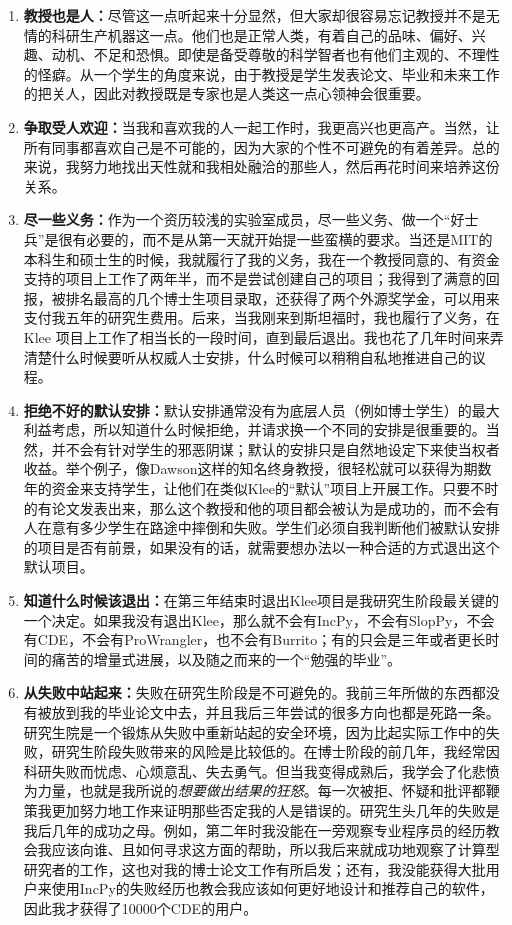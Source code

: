 \documentclass[12pt,UTF8,nofonts]{book}
\begin{document}
\begin{enumerate}
  \item \textbf{教授也是人：}尽管这一点听起来十分显然，但大家却很容易忘记教授并不是无情的科研生产机器这一点。他们也是正常人类，有着自己的品味、偏好、兴趣、动机、不足和恐惧。即使是备受尊敬的科学智者也有他们主观的、不理性的怪癖。从一个学生的角度来说，由于教授是学生发表论文、毕业和未来工作的把关人，因此对教授既是专家也是人类这一点心领神会很重要。
  \item \textbf{争取受人欢迎：}当我和喜欢我的人一起工作时，我更高兴也更高产。当然，让所有同事都喜欢自己是不可能的，因为大家的个性不可避免的有着差异。总的来说，我努力地找出天性就和我相处融洽的那些人，然后再花时间来培养这份关系。
  \item \textbf{尽一些义务：}作为一个资历较浅的实验室成员，尽一些义务、做一个“好士兵”是很有必要的，而不是从第一天就开始提一些蛮横的要求。当还是MIT的本科生和硕士生的时候，我就履行了我的义务，我在一个教授同意的、有资金支持的项目上工作了两年半，而不是尝试创建自己的项目；我得到了满意的回报，被排名最高的几个博士生项目录取，还获得了两个外源奖学金，可以用来支付我五年的研究生费用。后来，当我刚来到斯坦福时，我也履行了义务，在Klee 项目上工作了相当长的一段时间，直到最后退出。我也花了几年时间来弄清楚什么时候要听从权威人士安排，什么时候可以稍稍自私地推进自己的议程。
  \item \textbf{拒绝不好的默认安排：}默认安排通常没有为底层人员（例如博士学生）的最大利益考虑，所以知道什么时候拒绝，并请求换一个不同的安排是很重要的。当然，并不会有针对学生的邪恶阴谋；默认的安排只是自然地设定下来使当权者收益。举个例子，像Dawson这样的知名终身教授，很轻松就可以获得为期数年的资金来支持学生，让他们在类似Klee的“默认”项目上开展工作。只要不时的有论文发表出来，那么这个教授和他的项目都会被认为是成功的，而不会有人在意有多少学生在路途中摔倒和失败。学生们必须自我判断他们被默认安排的项目是否有前景，如果没有的话，就需要想办法以一种合适的方式退出这个默认项目。
  \item \textbf{知道什么时候该退出：}在第三年结束时退出Klee项目是我研究生阶段最关键的一个决定。如果我没有退出Klee，那么就不会有IncPy，不会有SlopPy，不会有CDE，不会有ProWrangler，也不会有Burrito；有的只会是三年或者更长时间的痛苦的增量式进展，以及随之而来的一个“勉强的毕业”。
  \item \textbf{从失败中站起来：}失败在研究生阶段是不可避免的。我前三年所做的东西都没有被放到我的毕业论文中去，并且我后三年尝试的很多方向也都是死路一条。研究生院是一个锻炼从失败中重新站起的安全环境，因为比起实际工作中的失败，研究生阶段失败带来的风险是比较低的。在博士阶段的前几年，我经常因科研失败而忧虑、心烦意乱、失去勇气。但当我变得成熟后，我学会了化悲愤为力量，也就是我所说的\emph{想要做出结果的狂怒}。每一次被拒、怀疑和批评都鞭策我更加努力地工作来证明那些否定我的人是错误的。研究生头几年的失败是我后几年的成功之母。例如，第二年时我没能在一旁观察专业程序员的经历教会我应该向谁、且如何寻求这方面的帮助，所以我后来就成功地观察了计算型研究者的工作，这也对我的博士论文工作有所启发；还有，我没能获得大批用户来使用IncPy的失败经历也教会我应该如何更好地设计和推荐自己的软件，因此我才获得了10000个CDE的用户。

\end{enumerate}
\end{document}
